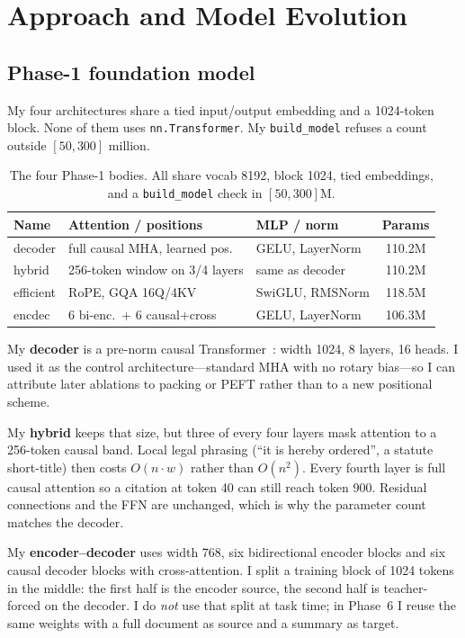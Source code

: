 \documentclass[11pt, oneside]{article}
\begin{document}
\section{Approach and Model Evolution}
\subsection{Phase-1 foundation model}
My four architectures share a tied input/output embedding and a 1024-token block. None of them uses \texttt{nn.Transformer}. My \texttt{build\_model} refuses a count outside $[50,300]$ million.

\begin{table}[H]
\centering
\small
\caption{The four Phase-1 bodies. All share vocab 8192, block 1024, tied embeddings, and a \texttt{build\_model} check in $[50,300]$M.}
\label{tab:arch}
\begin{tabular}{lllc}
\toprule
Name & Attention / positions & MLP / norm & Params \\
\midrule
decoder & full causal MHA, learned pos. & GELU, LayerNorm & 110.2M \\
hybrid & 256-token window on 3/4 layers & same as decoder & 110.2M \\
efficient & RoPE, GQA 16Q/4KV & SwiGLU, RMSNorm & 118.5M \\
encdec & 6 bi-enc.\ + 6 causal+cross & GELU, LayerNorm & 106.3M \\
\bottomrule
\end{tabular}
\end{table}

My \textbf{decoder} is a pre-norm causal Transformer~\cite{vaswani2017attention}: width 1024, 8 layers, 16 heads. I used it as the control architecture---standard MHA with no rotary bias---so I can attribute later ablations to packing or PEFT rather than to a new positional scheme.

My \textbf{hybrid} keeps that size, but three of every four layers mask attention to a 256-token causal band. Local legal phrasing (``it is hereby ordered'', a statute short-title) then costs $O(n\cdot w)$ rather than $O(n^2)$. Every fourth layer is full causal attention so a citation at token 40 can still reach token 900. Residual connections and the FFN are unchanged, which is why the parameter count matches the decoder.

My \textbf{encoder--decoder} uses width 768, six bidirectional encoder blocks and six causal decoder blocks with cross-attention. I split a training block of 1024 tokens in the middle: the first half is the encoder source, the second half is teacher-forced on the decoder. I do \emph{not} use that split at task time; in Phase~6 I reuse the same weights with a full document as source and a summary as target.
\end{document}
